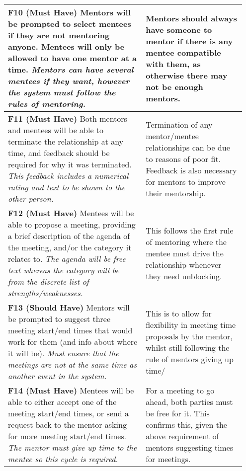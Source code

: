 \documentclass[10pt]{article}
\begin{document}
\begin{longtable}{|p{0.55\linewidth}|p{0.4\linewidth}|}
    \textbf{F10 (Must Have) }
    Mentors will be prompted to select mentees if they are not mentoring anyone.
    Mentees will only be allowed to have one mentor at a time.
    \textit{Mentors can have several mentees if they want, however the system
    must follow the rules of mentoring.}
        &
    Mentors should always have someone to mentor if there is any mentee
    compatible with them, as otherwise there may not be enough mentors.
    \\ \hline

    \textbf{F11 (Must Have) }
    Both mentors and mentees will be able to terminate the relationship at any
    time, and feedback should be required for why it was terminated.
    \textit{This feedback includes a numerical rating and text to be shown to
    the other person.}
        &
    Termination of any mentor/mentee relationships can be due to reasons of poor
    fit. Feedback is also necessary for mentors to improve their mentorship.
    \\ \hline

    \textbf{F12 (Must Have) }
    Mentees will be able to propose a meeting, providing a brief description of
    the agenda of the meeting, and/or the category it relates to.
    \textit{The agenda will be free text whereas the category will be from the
    discrete list of strengths/weaknesses.}
        &
    This follows the first rule of mentoring where the mentee must drive the
    relationship whenever they need unblocking.
    \\ \hline

    \textbf{F13 (Should Have) }
    Mentors will be prompted to suggest three meeting start/end times that would
    work for them (and info about where it will be).
    \textit{Must ensure that the meetings are not at the same time as another
    event in the system.}
        &
    This is to allow for flexibility in meeting time proposals by the mentor,
    whilst still following the rule of mentors giving up time/
    \\ \hline

    \textbf{F14 (Must Have) }
    Mentees will be able to either accept one of the meeting start/end times, or
    send a request back to the mentor asking for more meeting start/end times.
    \textit{The mentor must give up time to the mentee so this cycle is required.}
        &
    For a meeting to go ahead, both parties must be free for it. This confirms
    this, given the above requirement of mentors suggesting times for meetings.
    \\ \hline


\end{longtable}
\end{document}
